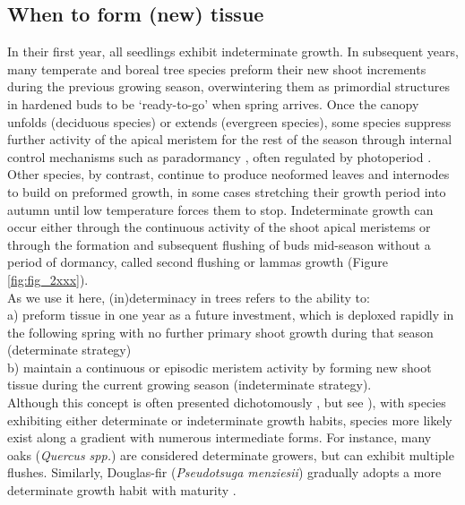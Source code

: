 \documentclass{article}
\begin{document}
	\subsection*{When to form (new) tissue}
	In their first year, all seedlings exhibit indeterminate growth. In subsequent years, many temperate and boreal tree species preform their new shoot increments during the previous growing season, overwintering them as primordial structures in hardened buds to be `ready-to-go' when spring arrives. Once the canopy unfolds (deciduous species) or extends (evergreen species), some species suppress further activity of the apical meristem for the rest of the season through internal control mechanisms such as paradormancy \citep{langEndoParaEcodormancy1987}, often regulated by photoperiod \citep{bohleniusCOFTRegulatory2006a}. Other species, by contrast, continue to produce neoformed leaves and internodes to build on preformed growth, in some cases stretching their growth period into autumn until low temperature forces them to stop. Indeterminate growth can occur either through the continuous activity of the shoot apical meristems or through the formation and subsequent flushing of buds mid-season without a period of dormancy, called second flushing or lammas growth (Figure \ref{fig:fig_2xxx}). \\
	As we use it here, (in)determinacy in trees refers to the ability to:\\
	a) preform tissue in one year as a future investment, which is deploxed rapidly in the following spring with no further primary shoot growth during that season (determinate strategy)\\
	b) maintain a continuous or episodic meristem activity by forming new shoot tissue during the current growing season (indeterminate strategy).\\

Although this concept is often presented dichotomously \citep{kozlowskiGrowthControlWoody1997, lechowiczWhyTemperateDeciduous1984a}, but see \citealp{kikuzawaLeafSurvivalWoody1983, damascosBudCompositionBranching2005}), with species exhibiting either determinate or indeterminate growth habits, species more likely exist along a gradient with numerous intermediate forms. For instance, many oaks (\textit{Quercus spp.}) are considered determinate growers, but can exhibit multiple flushes. Similarly, Douglas-fir (\textit{Pseudotsuga menziesii}) gradually adopts a more determinate growth habit with maturity \citep{borchertConceptJuvenilityWoody1976, heuretOntogeneticTrendsMorphological2006}.\\
\end{document}

